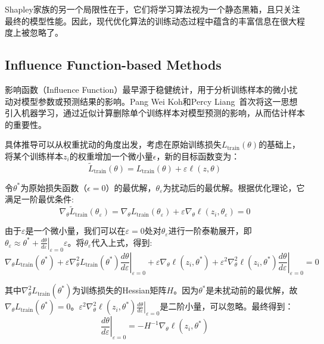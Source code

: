 \documentclass[12pt,a4paper]{ctexart}
\theoremstyle{definition}
\theoremstyle{plain}
\begin{document}
Shapley家族的另一个局限性在于，它们将学习算法视为一个静态黑箱，且只关注最终的模型性能。因此，现代优化算法的训练动态过程中蕴含的丰富信息在很大程度上被忽略了。

\subsection{Influence Function-based Methods}
影响函数（Influence Function）最早源于稳健统计，用于分析训练样本的微小扰动对模型参数或预测结果的影响。Pang Wei Koh和Percy Liang~\cite{influence}首次将这一思想引入机器学习，通过近似计算删除单个训练样本对模型预测的影响，从而估计样本的重要性。

具体推导可以从权重扰动的角度出发，考虑在原始训练损失\(L_{\mathrm{train}}(\theta)\)的基础上，将某个训练样本$z_i$的权重增加一个微小量$\epsilon$，新的目标函数变为：
\begin{equation}
\tilde{L}_{\mathrm{train}}(\theta) = L_{\mathrm{train}}(\theta) + \varepsilon \ell(z,\theta)
\end{equation}

令\(\theta^{*}\)为原始损失函数（$\epsilon=0$）的最优解，\(\theta_{\varepsilon}\)为扰动后的最优解。根据优化理论，它满足一阶最优条件:
\begin{equation}
\nabla_{\theta} \tilde{L}_{\mathrm{train}}(\theta_{\varepsilon}) = \nabla_{\theta} L_{\mathrm{train}}(\theta_{\varepsilon}) + \varepsilon \nabla_{\theta} \ell(z_i, \theta_{\varepsilon}) = 0
\end{equation}

由于\(\varepsilon\)是一个微小量，我们可以在\(\varepsilon=0\)处对\(\theta_{\varepsilon}\)进行一阶泰勒展开，即$\theta_{\varepsilon} \approx \theta^{*} + \left.\frac{d\theta}{d\varepsilon}\right|_{\varepsilon=0}\varepsilon$。将\(\theta_{\varepsilon}\)代入上式，得到:
\begin{equation}
\nabla_{\theta} L_{\mathrm{train}}(\theta^{*}) + \varepsilon\nabla_{\theta}^2 L_{\mathrm{train}}(\theta^{*})\left.\frac{d\theta}{d\varepsilon}\right|_{\varepsilon=0} + \varepsilon \nabla_{\theta} \ell(z_i, \theta^{*}) + \varepsilon^2\nabla_{\theta}^2 \ell(z_i, \theta^{*})\left.\frac{d\theta}{d\varepsilon}\right|_{\varepsilon=0}= 0
\end{equation}

其中$\nabla_{\theta}^2 L_{\mathrm{train}}(\theta^{*})$为训练损失的Hessian矩阵$H$。因为$\theta^{*}$是未扰动前的最优解，故\(\nabla_{\theta} L_{\mathrm{train}}(\theta^{*})=0\)。$\varepsilon^2\nabla_{\theta}^2 \ell(z_i, \theta^{*})\left.\frac{d\theta}{d\varepsilon}\right|_{\varepsilon=0}$是二阶小量，可以忽略。最终得到：
\begin{equation}
\left.\frac{d\theta}{d\varepsilon}\right|_{\varepsilon=0} = -H^{-1} \nabla_{\theta} \ell(z_i, \theta^{*})
\end{equation}
\end{document}
